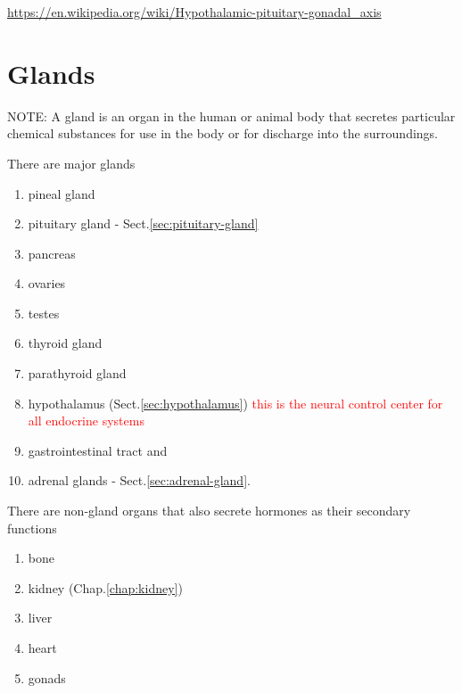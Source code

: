 \url{https://en.wikipedia.org/wiki/Hypothalamic-pituitary-gonadal_axis}

\section{Glands}
\label{sec:glands}

NOTE: A gland is an organ in the human or animal body that secretes particular
chemical substances for use in the body or for discharge into the surroundings.

There are major glands
\begin{enumerate}
  \item pineal gland

  \item pituitary gland - Sect.\ref{sec:pituitary-gland}
  
  \item pancreas
  
  \item ovaries

  \item testes
  
  \item thyroid gland
  
  \item parathyroid gland

  \item hypothalamus (Sect.\ref{sec:hypothalamus}) \textcolor{red}{this is the
  neural control center for all endocrine systems}
  
  \item gastrointestinal tract and 
  
  \item adrenal  glands - Sect.\ref{sec:adrenal-gland}.
\end{enumerate}

There are non-gland organs that also secrete hormones as their secondary
functions
\begin{enumerate}
  \item bone
  
  \item kidney (Chap.\ref{chap:kidney})
  
  \item liver
  
  \item heart
  
  \item gonads
  
\end{enumerate}

